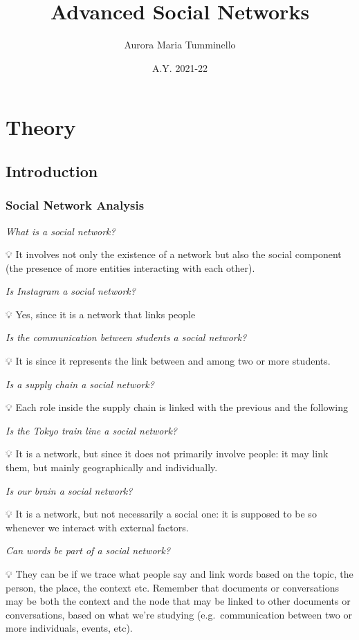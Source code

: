 \documentclass[
  notitlepage,
  onecolumn,
  openany]{book}
\title{Advanced Social Networks}
\author{Aurora Maria Tumminello}
\date{A.Y. 2021-22}
\begin{document}
\maketitle

{
\hypersetup{linkcolor=}
\setcounter{tocdepth}{1}
\tableofcontents
}
\part{Theory}

\hypertarget{introduction}{%
\chapter{Introduction}\label{introduction}}

\hypertarget{social-network-analysis}{%
\section{Social Network Analysis}\label{social-network-analysis}}

\emph{What is a social network?}

💡 It involves not only the existence of a network but also the social component (the presence of more entities interacting with each other).

\emph{Is Instagram a social network?}

💡 Yes, since it is a network that links people

\emph{Is the communication between students a social network?}

💡 It is since it represents the link between and among two or more students.

\emph{Is a supply chain a social network?}

💡 Each role inside the supply chain is linked with the previous and the following

\emph{Is the Tokyo train line a social network?}

💡 It is a network, but since it does not primarily involve people: it may link them, but mainly geographically and individually.

\emph{Is our brain a social network?}

💡 It is a network, but not necessarily a social one: it is supposed to be so whenever we interact with external factors.

\emph{Can words be part of a social network?}

💡 They can be if we trace what people say and link words based on the topic, the person, the place, the context etc. Remember that documents or conversations may be both the context and the node that may be linked to other documents or conversations, based on what we're studying (e.g.~communication between two or more individuals, events, etc).
\end{document}
